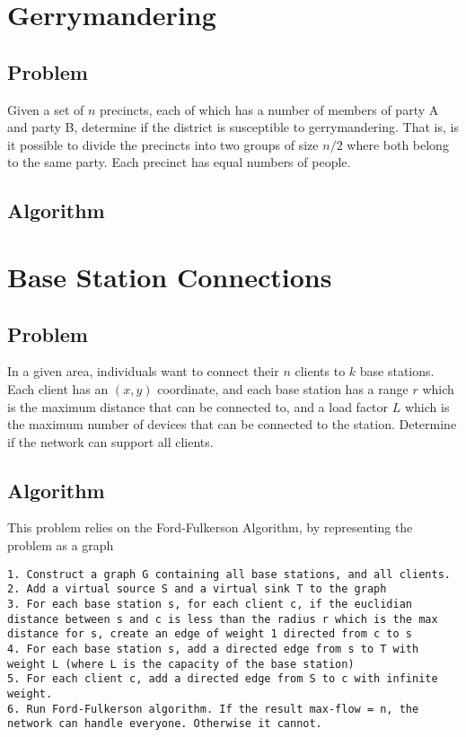 \documentclass[titlepage]{article}
\begin{document}
\section{Gerrymandering}
\subsection{Problem}
Given a set of $n$ precincts, each of which has a number of members of party A and party B, determine if the district is susceptible to gerrymandering.
That is, is it possible to divide the precincts into two groups of size $n/2$ where both belong to the same party. Each precinct has equal numbers of
people.
\subsection{Algorithm}
\section{Base Station Connections}
\subsection{Problem}
In a given area, individuals want to connect their $n$ clients to $k$ base stations. Each client has an $(x, y)$ coordinate, and each base station
has a range $r$ which is the maximum distance that can be connected to, and a load factor $L$ which is the maximum number of devices that
can be connected to the station. Determine if the network can support all clients.
\subsection{Algorithm}
This problem relies on the Ford-Fulkerson Algorithm, by representing the problem as a graph
\begin{lstlisting}
1. Construct a graph G containing all base stations, and all clients.
2. Add a virtual source S and a virtual sink T to the graph
3. For each base station s, for each client c, if the euclidian distance between s and c is less than the radius r which is the max distance for s, create an edge of weight 1 directed from c to s
4. For each base station s, add a directed edge from s to T with weight L (where L is the capacity of the base station)
5. For each client c, add a directed edge from S to c with infinite weight.
6. Run Ford-Fulkerson algorithm. If the result max-flow = n, the network can handle everyone. Otherwise it cannot.
\end{lstlisting}
\end{document}
